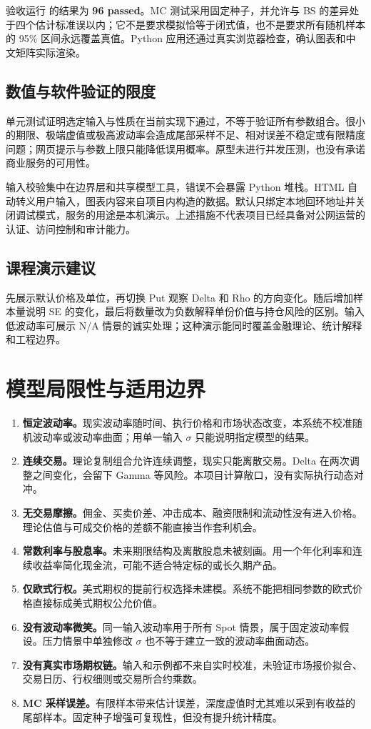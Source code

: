 \documentclass[UTF8,a4paper,12pt]{ctexart}
\begin{document}
验收运行  的结果为 \textbf{96 passed}。MC 测试采用固定种子，并允许与 BS 的差异处于四个估计标准误以内；它不是要求模拟恰等于闭式值，也不是要求所有随机样本的 95\% 区间永远覆盖真值。Python 应用还通过真实浏览器检查，确认图表和中文矩阵实际渲染。

\subsection{数值与软件验证的限度}
单元测试证明选定输入与性质在当前实现下通过，不等于验证所有参数组合。很小的期限、极端虚值或极高波动率会造成尾部采样不足、相对误差不稳定或有限精度问题；网页提示与参数上限只能降低误用概率。原型未进行并发压测，也没有承诺商业服务的可用性。

输入校验集中在边界层和共享模型工具，错误不会暴露 Python 堆栈。HTML 自动转义用户输入，图表内容来自项目内构造的数据。默认只绑定本地回环地址并关闭调试模式，服务的用途是本机演示。上述措施不代表项目已经具备对公网运营的认证、访问控制和审计能力。

\subsection{课程演示建议}
先展示默认价格及单位，再切换 Put 观察 Delta 和 Rho 的方向变化。随后增加样本量说明 SE 的变化，最后将数量改为负数解释单份价值与持仓风险的区别。输入低波动率可展示 N/A 情景的诚实处理；这种演示能同时覆盖金融理论、统计解释和工程边界。
\newpage

\section{模型局限性与适用边界}
\begin{enumerate}[label=\arabic*.]
\item \textbf{恒定波动率。}现实波动率随时间、执行价格和市场状态改变，本系统不校准随机波动率或波动率曲面；用单一输入 $\sigma$ 只能说明指定模型的结果。
\item \textbf{连续交易。}理论复制组合允许连续调整，现实只能离散交易。Delta 在两次调整之间变化，会留下 Gamma 等风险。本项目计算敞口，没有实际执行动态对冲。
\item \textbf{无交易摩擦。}佣金、买卖价差、冲击成本、融资限制和流动性没有进入价格。理论估值与可成交价格的差额不能直接当作套利机会。
\item \textbf{常数利率与股息率。}未来期限结构及离散股息未被刻画。用一个年化利率和连续收益率简化现金流，可能不适合特定标的或长久期产品。
\item \textbf{仅欧式行权。}美式期权的提前行权选择未建模。系统不能把相同参数的欧式价格直接标成美式期权公允价值。
\item \textbf{没有波动率微笑。}同一输入波动率用于所有 Spot 情景，属于固定波动率假设。压力情景中单独修改 $\sigma$ 也不等于建立一致的波动率曲面动态。
\item \textbf{没有真实市场期权链。}输入和示例都不来自实时校准，未验证市场报价拟合、交易日历、行权细则或交易所合约乘数。
\item \textbf{MC 采样误差。}有限样本带来估计误差，深度虚值时尤其难以采到有收益的尾部样本。固定种子增强可复现性，但没有提升统计精度。
\end{enumerate}
\end{document}

